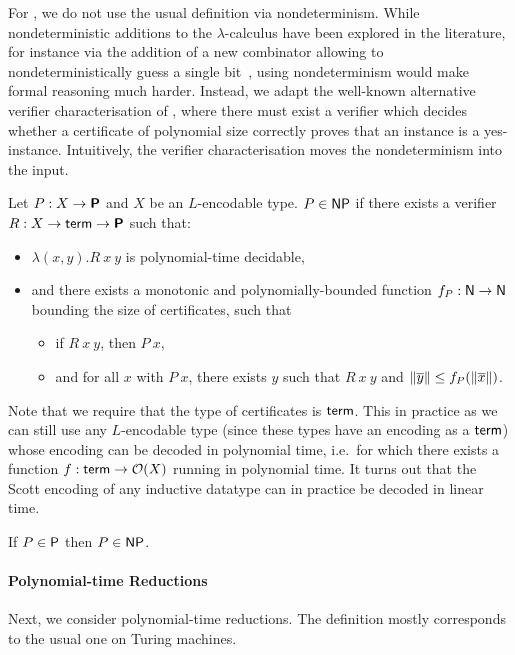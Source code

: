 For \NP{}, we do not use the usual definition via nondeterminism. While nondeterministic additions to the $\lambda$-calculus have been explored in the literature, for instance via the addition of a new combinator allowing to nondeterministically guess a single bit~\cite{kutzner:nondet_lambda}, using nondeterminism would make formal reasoning much harder.
Instead, we adapt the well-known alternative verifier characterisation of \NP{}, where there must exist a verifier which decides whether a certificate of polynomial size correctly proves that an instance is a yes-instance. Intuitively, the verifier characterisation moves the nondeterminism into the input.
\begin{definition}[\NP{}][inNP]
  Let $P : X \rightarrow \textsf{\bfseries P}$ and $X$ be an $L$-encodable type. $P \in \normalfont{\textsf{NP}{}}$ if there exists a verifier $R : X \rightarrow \textsf{term} \rightarrow \textsf{\bfseries P}$ such that: 
  \begin{itemize}
    \item $\lambda (x, y). R~x~y$ is polynomial-time decidable, 
    \item and there exists a monotonic and polynomially-bounded function $f_P : \mathsf{N} \rightarrow \mathsf{N}$ bounding the size of certificates, such that
      \begin{itemize}
        \item if $R~x~y$, then $P~x$, 
        \item and for all $x$ with $P~x$, there exists $y$ such that $R~x~y$ and $\left\lVert\overline{y}\right\rVert \le f_P(\left\lVert\overline{x}\right\rVert)$.
      \end{itemize}
  \end{itemize}
\end{definition}

Note that we require that the type of certificates is $\textsf{term}$. This  in practice as we can still use any $L$-encodable type (since these types have an encoding as a $\textsf{term}$) whose encoding can be decoded in polynomial time, i.e.\ for which there exists a function $f : \textsf{term} \rightarrow \mathcal{O}{(X)}$ running in polynomial time. It turns out that the Scott encoding of any inductive datatype can in practice be decoded in linear time.

\begin{fact}
  If $P \in \normalfont{\textsf{P}}$ then $P \in \textsf{NP}{}$. 
\end{fact}

\paragraph{Polynomial-time Reductions}
Next, we consider polynomial-time reductions. The definition mostly corresponds to the usual one on Turing machines. 

